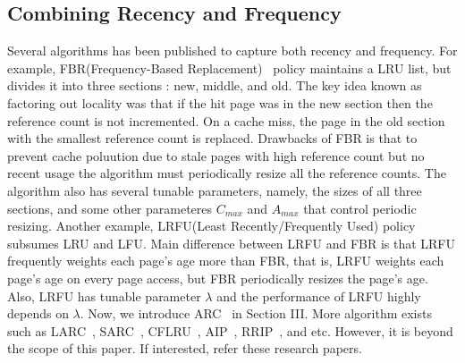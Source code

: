 \subsection{Combining Recency and Frequency}
Several algorithms has been published to capture both recency and frequency. For example, FBR(Frequency-Based Replacement)~\cite{fbr} policy maintains a LRU list, but divides it into three sections : new, middle, and old. The key idea known as factoring out locality was that if the hit page was in the new section then the reference count is not incremented. On a cache miss, the page in the old section with the smallest reference count is replaced. Drawbacks of FBR is that to prevent cache poluution due to stale pages with high reference count but no recent usage the algorithm must periodically resize all the reference counts. The algorithm also has several tunable parameters, namely, the sizes of all three sections, and some other parameteres $C_{max}$ and $A_{max}$ that control periodic resizing. Another example, LRFU(Least Recently/Frequently Used) policy ~\cite{lrfu} subsumes LRU and LFU. Main difference between LRFU and FBR is that LRFU frequently weights each page's age more than FBR, that is, LRFU weights each page's age on every page access, but FBR periodically resizes the page's age. Also, LRFU has tunable parameter $\lambda$ and the performance of LRFU highly depends on $\lambda$. Now, we introduce ARC~\cite{arc} in Section III. More algorithm exists such as LARC~\cite{larc}, SARC~\cite{sarc}, CFLRU~\cite{cflru}, AIP~\cite{aip}, RRIP~\cite{rrip}, and etc. However, it is beyond the scope of this paper. If interested, refer these research papers.






